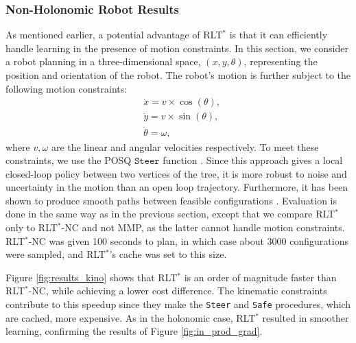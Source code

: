 \documentclass[a4paper,11pt]{report}
\begin{document}
  \subsubsection{Non-Holonomic Robot Results}
  As mentioned earlier, a potential advantage of RLT$^*$ is that it can efficiently handle learning in the presence of motion constraints. In this section, we consider a robot planning in a three-dimensional space, $(x,y,\theta)$, representing the position and orientation of the robot. The robot's motion is further subject to the following motion constraints:
%
  \begin{align}
  	&\dot{x} = v\times\cos(\theta),\\
  	&\dot{y} = v\times\sin(\theta),\\
  	&\dot{\theta} = \omega,
  \end{align}
  where $v,\omega$ are the linear and angular velocities respectively.
  To meet these constraints, we use the POSQ $\texttt{Steer}$ function \cite{palmieri2014novel}.  Since this approach gives a local closed-loop policy between two vertices of the tree, it is  more robust to noise and uncertainty in the motion than an open loop trajectory. Furthermore, it has been shown to produce smooth paths between feasible configurations \cite{palmieri2014novel}. Evaluation is done in the same way as in the previous section, except that we compare RLT$^*$ only to RLT$^*$-NC and not MMP, as the latter cannot handle motion constraints.
RLT$^*$-NC was given 100 seconds to plan, in which case about 3000 configurations were sampled, and RLT$^*$'s cache was set to this size. 

Figure \ref{fig:results_kino} shows that RLT$^*$ is an order of magnitude faster than RLT$^*$-NC, while achieving a lower cost difference. The kinematic constraints contribute to this speedup since they make the \texttt{Steer} and \texttt{Safe} procedures, which are cached, more expensive. As in the holonomic case, RLT$^*$ resulted in smoother learning, confirming the results of Figure \ref{fig:in_prod_grad}. 
\end{document}
